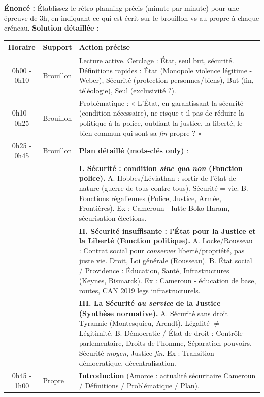 \documentclass[11pt]{article}
\newcommand{\cle}[1]{{\popxbold\color{popdark}#1}}
\begin{document}
\begin{exoresolu}
\textbf{Énoncé :} Établissez le rétro-planning précis (minute par minute) pour une épreuve de 3h, en indiquant ce qui est écrit sur le brouillon vs au propre à chaque créneau.
\tcblower
\textbf{Solution détaillée :}

\begin{center}
\begin{tabularx}{\linewidth}{|c|l|X|}\hline
\textbf{Horaire} & \textbf{Support} & \textbf{Action précise} \\ \hline
0h00 - 0h10 & Brouillon & Lecture active. Cerclage : \cle{État}, \cle{seul but}, \cle{sécurité}. Définitions rapides : État (Monopole violence légitime - Weber), Sécurité (protection personnes/biens), But (fin, téléologie), Seul (exclusivité ?). \\ \hline
0h10 - 0h25 & Brouillon & Problématique : « L'État, en garantissant la sécurité (condition nécessaire), ne risque-t-il pas de réduire la politique à la police, oubliant la justice, la liberté, le bien commun qui sont sa \emph{fin} propre ? » \\ \hline
0h25 - 0h45 & Brouillon & \textbf{Plan détaillé (mots-clés only)} : \\
& & \textbf{I. Sécurité : condition \emph{sine qua non} (Fonction police).} A. Hobbes/Léviathan : sortir de l'état de nature (guerre de tous contre tous). Sécurité = vie. B. Fonctions régaliennes (Police, Justice, Armée, Frontières). Ex : Cameroun - lutte Boko Haram, sécurisation élections. \\
& & \textbf{II. Sécurité insuffisante : l'État pour la Justice et la Liberté (Fonction politique).} A. Locke/Rousseau : Contrat social pour \emph{conserver} liberté/propriété, pas juste vie. Droit, Loi générale (Rousseau). B. État social / Providence : Éducation, Santé, Infrastructures (Keynes, Bismarck). Ex : Cameroun - éducation de base, routes, CAN 2019 legs infrastructurels. \\
& & \textbf{III. La Sécurité \emph{au service} de la Justice (Synthèse normative).} A. Sécurité sans droit = Tyrannie (Montesquieu, Arendt). Légalité $\neq$ Légitimité. B. Démocratie / État de droit : Contrôle parlementaire, Droits de l'homme, Séparation pouvoirs. Sécurité \emph{moyen}, Justice \emph{fin}. Ex : Transition démocratique, décentralisation. \\ \hline
0h45 - 1h00 & Propre & \textbf{Introduction} (Amorce : actualité sécuritaire Cameroun / Définitions / Problématique / Plan). \\ \hline

\end{tabularx}
\end{center}
\end{exoresolu}
\end{document}
